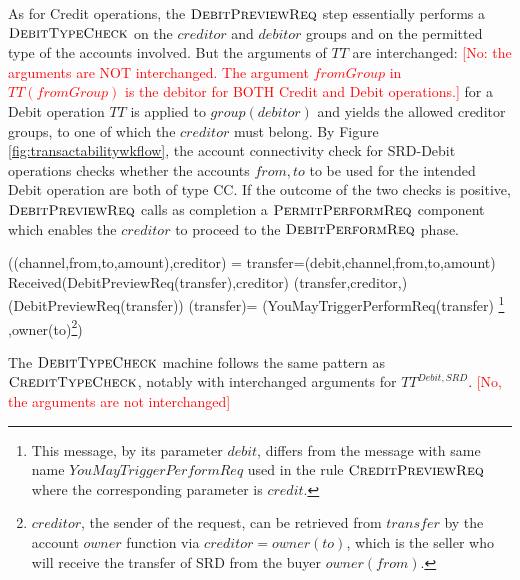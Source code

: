 As for Credit operations, the $\hbox{\sc DebitPreviewReq}$ step essentially performs a $\hbox{\sc DebitTypeCheck}$ on the $creditor$ and $debitor$ groups and on the permitted type of the accounts involved. But the arguments of $TT$ are interchanged: 
\textcolor{red}{[No: the arguments are NOT interchanged. The argument $fromGroup$ in $TT(fromGroup)$ is the debitor for BOTH Credit and Debit operations.]} 
for a Debit operation $TT$ is applied to  $group(debitor)$ and yields the allowed creditor groups, to one of which the $creditor$ must belong. By Figure \ref{fig:transactabilitywkflow}, the account connectivity check for SRD-Debit operations checks whether the accounts $from,to$ to be used for the intended Debit operation are both of type CC. If the outcome of the two checks is positive, $\hbox{\sc DebitPreviewReq}$ calls as completion a $\hbox{\sc PermitPerformReq}$ component which enables the $creditor$ to proceed to the $\hbox{\sc DebitPerformReq}$ phase. 


\begin{asm}
((channel,from,to,amount),creditor)  =\+
  \LET transfer=(debit,channel,from,to,amount)\\
  \IF Received(DebitPreviewReq(transfer),\FROM creditor) \THEN \+   
          (transfer,creditor,)\\
      (DebitPreviewReq(transfer)) \dec\-
\WHERE \+
(transfer)=\+
(YouMayTriggerPerformReq(transfer)
\footnote{This message,  by its parameter $debit$, differs 
	from the message with same name $YouMayTriggerPerformReq$ used in the rule $\hbox{\sc CreditPreviewReq}$ where the corresponding parameter is $credit$.}
,\TO  owner(to)\footnote{$creditor$, the sender of the 
	request, can be retrieved from $transfer$ by the account $owner$ function via $creditor=owner(to)$, which is the seller who will receive the transfer of SRD from the buyer $owner(from)$.}) 
\end{asm}

The $\hbox{\sc DebitTypeCheck}$ machine follows the same pattern as $\hbox{\sc CreditTypeCheck}$, 
notably with interchanged arguments for $TT^{Debit,SRD}$.
\textcolor{red}{[No, the arguments are not interchanged]}


